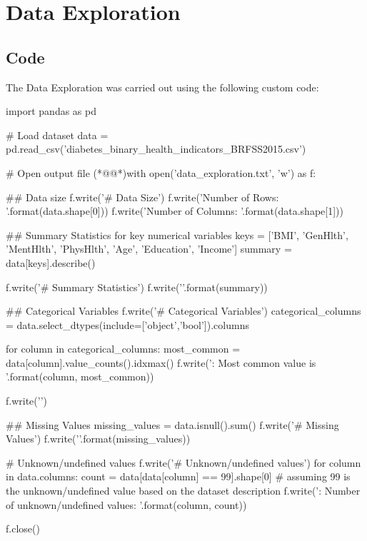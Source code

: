 \documentclass[11pt]{article}
\begin{document}
\section{Data Exploration}
\subsection{{Code}}
The Data Exploration was carried out using the following custom code:

\begin{python}

import pandas as pd

# Load dataset
data = pd.read_csv('diabetes_binary_health_indicators_BRFSS2015.csv')

# Open output file
(*@@*)with open('data_exploration.txt', 'w') as f: 
    
    ## Data size
    f.write('# Data Size\n')
    f.write('Number of Rows: {}\n'.format(data.shape[0]))
    f.write('Number of Columns: {}\n\n'.format(data.shape[1]))

    ## Summary Statistics for key numerical variables
    keys = ['BMI', 'GenHlth', 'MentHlth', 'PhysHlth', 'Age', 'Education', 'Income']
    summary = data[keys].describe()

    f.write('# Summary Statistics\n')
    f.write('{}\n\n'.format(summary))

    ## Categorical Variables
    f.write('# Categorical Variables\n')
    categorical_columns = data.select_dtypes(include=['object','bool']).columns
    
    for column in categorical_columns:
        most_common = data[column].value_counts().idxmax()
        f.write('{}: Most common value is {}\n'.format(column, most_common))

    f.write('\n')

    ## Missing Values
    missing_values = data.isnull().sum()
    f.write('# Missing Values\n')
    f.write('{}\n\n'.format(missing_values))

    # Unknown/undefined values
    f.write('# Unknown/undefined values\n')
    for column in data.columns:
        count = data[data[column] == 99].shape[0]  # assuming 99 is the unknown/undefined value based on the dataset description
        f.write('{}: Number of unknown/undefined values: {}\n'.format(column, count))

f.close()

\end{python}
\end{document}

